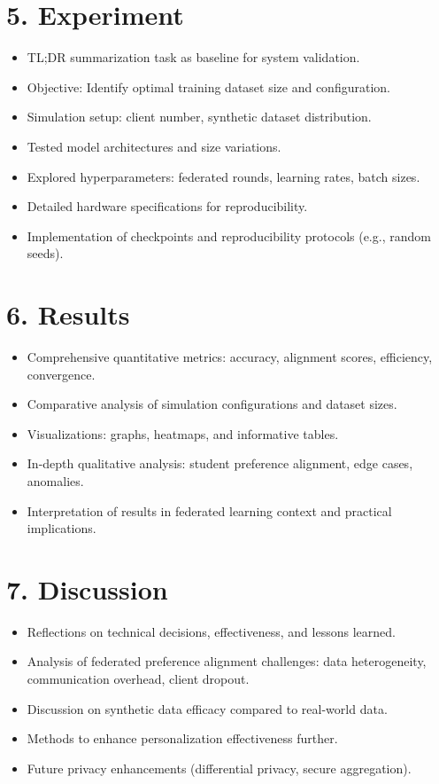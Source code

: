 \documentclass[headsepline,footsepline,footinclude=false,oneside,fontsize=10pt,paper=a4]{scrbook}
\begin{document}
\section*{5. Experiment}
\begin{itemize}[leftmargin=1.5em]
    \item TL;DR summarization task as baseline for system validation.
    \item Objective: Identify optimal training dataset size and configuration.
    \item Simulation setup: client number, synthetic dataset distribution.
    \item Tested model architectures and size variations.
    \item Explored hyperparameters: federated rounds, learning rates, batch sizes.
    \item Detailed hardware specifications for reproducibility.
    \item Implementation of checkpoints and reproducibility protocols (e.g., random seeds).
\end{itemize}

\section*{6. Results}
\begin{itemize}[leftmargin=1.5em]
    \item Comprehensive quantitative metrics: accuracy, alignment scores, efficiency, convergence.
    \item Comparative analysis of simulation configurations and dataset sizes.
    \item Visualizations: graphs, heatmaps, and informative tables.
    \item In-depth qualitative analysis: student preference alignment, edge cases, anomalies.
    \item Interpretation of results in federated learning context and practical implications.
\end{itemize}

\section*{7. Discussion}
\begin{itemize}[leftmargin=1.5em]
    \item Reflections on technical decisions, effectiveness, and lessons learned.
    \item Analysis of federated preference alignment challenges: data heterogeneity, communication overhead, client dropout.
    \item Discussion on synthetic data efficacy compared to real-world data.
    \item Methods to enhance personalization effectiveness further.
    \item Future privacy enhancements (differential privacy, secure aggregation).
\end{itemize}
\end{document}
